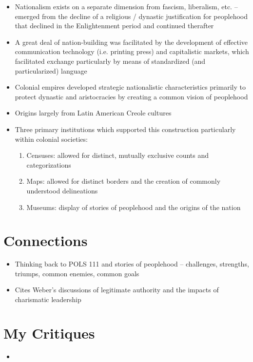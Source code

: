 \documentclass[12pt]{article}
\begin{document}
\begin{itemize}[leftmargin=*, itemsep=4pt]
    \item Nationalism exists on a separate dimension from fascism, liberalism, etc. -- emerged from the decline of a religious / dynastic justification for peoplehood that declined in the Enlightenment period and continued therafter
    \item A great deal of nation-building was facilitated by the development of effective communication technology (i.e. printing press) and capitalistic markets, which facilitated exchange particularly by means of standardized (and particularized) language
    \item Colonial empires developed strategic nationalistic characteristics primarily to protect dynastic and aristocracies by creating a common vision of peoplehood
    \item Origins largely from Latin American Creole cultures
    \item Three primary institutions which supported this construction particularly within colonial societies:
    \begin{enumerate}
        \item Censuses: allowed for distinct, mutually exclusive counts and categorizations
        \item Maps: allowed for distinct borders and the creation of commonly understood delineations
        \item Museums: display of stories of peoplehood and the origins of the nation
    \end{enumerate}
\end{itemize}


\section{Connections}

\begin{itemize}[leftmargin=*, itemsep=4pt]
    \item Thinking back to POLS 111 and stories of peoplehood -- challenges, strengths, triumps, common enemies, common goals
    \item Cites Weber's discussions of legitimate authority and the impacts of charismatic leadership
\end{itemize}


\section{My Critiques}

\begin{itemize}[leftmargin=*, itemsep=4pt]
    \item
\end{itemize}
\end{document}

